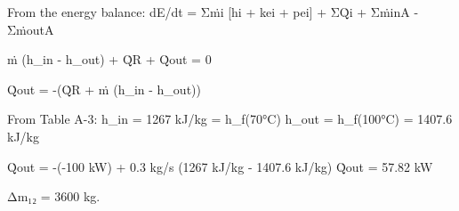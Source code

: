 From the energy balance:  
dE/dt = Σṁi [hi + kei + pei] + ΣQ̇i + ΣṁinA - ΣṁoutA  

ṁ (h_in - h_out) + Q̇R + Q̇out = 0  

Q̇out = -(Q̇R + ṁ (h_in - h_out))  

From Table A-3:  
h_in = 1267 kJ/kg = h_f(70°C)  
h_out = h_f(100°C) = 1407.6 kJ/kg  

Q̇out = -(-100 kW) + 0.3 kg/s (1267 kJ/kg - 1407.6 kJ/kg)  
Q̇out = 57.82 kW

Δm₁₂ = 3600 kg.